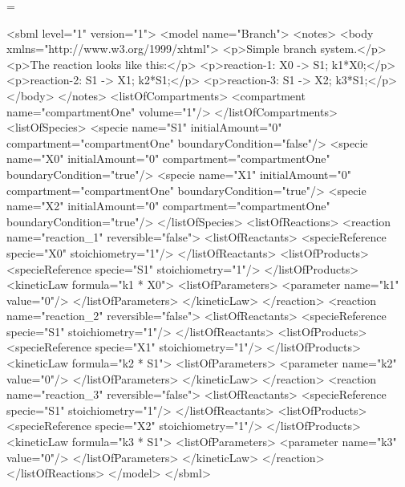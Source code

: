 \documentclass[10pt]{cekarticle}
\makeatletter
\let\realnormalsize=\normalsize
\def\preveqno{}\let\real@float=\@float \let\realend@float=\end@float
\def\@float{\let\@savefreelist\@freelist\real@float}
\def\liih@math{\ifmmode$\else\bad@math\fi}
\def\end@float{\realend@float\global\let\@freelist\@savefreelist}
\def\adjustnormalsize{\def\normalsize{\mathsurround=0pt \realnormalsize
 \parindent=0pt\abovedisplayskip=0pt\belowdisplayskip=0pt}%
 \def\phantompar{\csname par\endcsname}\normalsize}%
\def\lthtmltypeout#1{{\let\protect\string \immediate\write\lthtmlwrite{#1}}}%
\newcommand\lthtmlvboxmathA{\adjustnormalsize\setbox\sizebox=\vbox\bgroup %
 \let\ifinner=\iffalse \let\)\liih@math }%
\newcommand\lthtmlboxmathZ{\@next\next\@currlist{}{\def\next{\voidb@x}}%
 \expandafter\box\next\egroup}%
\newcommand\lthtmlmathtype[1]{\gdef\lthtmlmathenv{#1}}%
\newcommand\lthtmllogmath{\lthtmltypeout{l2hSize %
:\lthtmlmathenv:\the\ht\sizebox::\the\dp\sizebox::\the\wd\sizebox.\preveqno}}%
\newcommand\lthtmlfigureA[1]{\let\@savefreelist\@freelist
       \lthtmlmathtype{#1}\lthtmlvboxmathA}%
\newcommand\lthtmlfigureZ{\lthtmlboxmathZ\lthtmllogmath\copy\sizebox
       \global\let\@freelist\@savefreelist}%
\def\lthtmlcheckvsize{\ifdim\ht\sizebox<\vsize 
  \ifdim\wd\sizebox<\hsize\expandafter\hfill\fi \expandafter\vfill
  \else\expandafter\vss\fi}%
\makeatother
\begin{document}
{\newpage\clearpage
\lthtmlfigureA{example646}%
\begin{example}
<sbml level="1" version="1">
    <model name="Branch">
        <notes>
            <body xmlns="http://www.w3.org/1999/xhtml">
                <p>Simple branch system.</p>
                <p>The reaction looks like this:</p>
                <p>reaction-1:   X0 -> S1; k1*X0;</p>
                <p>reaction-2:   S1 -> X1; k2*S1;</p>
                <p>reaction-3:   S1 -> X2; k3*S1;</p>
            </body>
        </notes>
        <listOfCompartments>
            <compartment name="compartmentOne" volume="1"/>
        </listOfCompartments>
        <listOfSpecies>
            <specie name="S1" initialAmount="0" compartment="compartmentOne"
                    boundaryCondition="false"/>
            <specie name="X0" initialAmount="0" compartment="compartmentOne"
                    boundaryCondition="true"/>
            <specie name="X1" initialAmount="0" compartment="compartmentOne"
                    boundaryCondition="true"/>
            <specie name="X2" initialAmount="0" compartment="compartmentOne"
                    boundaryCondition="true"/>
        </listOfSpecies>
        <listOfReactions>
            <reaction name="reaction_1" reversible="false">
                <listOfReactants>
                    <specieReference specie="X0" stoichiometry="1"/>
                </listOfReactants>
                <listOfProducts>
                    <specieReference specie="S1" stoichiometry="1"/>
                </listOfProducts>
                <kineticLaw formula="k1 * X0">
                    <listOfParameters>
                        <parameter name="k1" value="0"/>
                    </listOfParameters>
                </kineticLaw>
            </reaction>
            <reaction name="reaction_2" reversible="false">
                <listOfReactants>
                    <specieReference specie="S1" stoichiometry="1"/>
                </listOfReactants>
                <listOfProducts>
                    <specieReference specie="X1" stoichiometry="1"/>
                </listOfProducts>
                <kineticLaw formula="k2 * S1">
                    <listOfParameters>
                        <parameter name="k2" value="0"/>
                    </listOfParameters>
                </kineticLaw>
            </reaction>
            <reaction name="reaction_3" reversible="false">
                <listOfReactants>
                    <specieReference specie="S1" stoichiometry="1"/>
                </listOfReactants>
                <listOfProducts>
                    <specieReference specie="X2" stoichiometry="1"/>
                </listOfProducts>
                <kineticLaw formula="k3 * S1">
                    <listOfParameters>
                        <parameter name="k3" value="0"/>
                    </listOfParameters>
                </kineticLaw>
            </reaction>
        </listOfReactions>
    </model>
</sbml>
\end{example}%
\lthtmlfigureZ
\lthtmlcheckvsize\clearpage}
\end{document}
